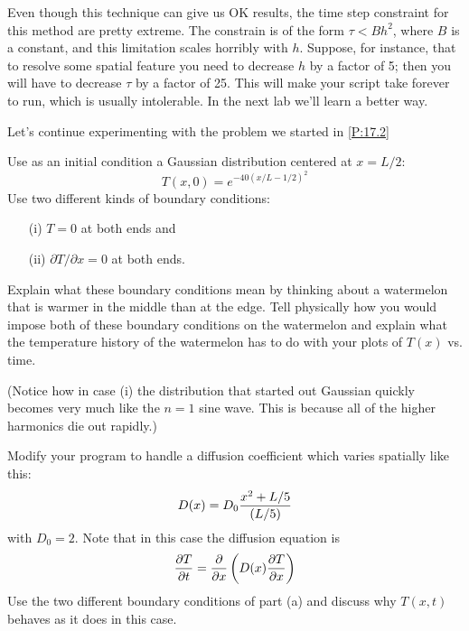Even though this technique can give us OK results, the time
step constraint for this method are pretty extreme.  The
constrain is of the form $\tau < B h^2$, where $B$ is a
constant, and this limitation scales horribly with $h$.
Suppose, for instance, that to resolve some spatial feature you
need to decrease $h$ by a factor of 5; then you will have to
decrease $\tau$ by a factor of 25. This will make your script
take forever to run, which is usually intolerable.  In the next
lab we'll learn a better way.


\begin{enumerate}
\prob  \label{P:17.3} Let's continue experimenting with the problem we started in
\ref{P:17.2}
\begin{enumerate}
\subprob \label{P:17.3a} Use as an initial condition a
    Gaussian distribution centered at $x=L/2$:
    \begin{equation}
        T(x,0) = e^{-40(x/L-1/2)^2}
    \end{equation}
    Use two different kinds of boundary conditions:
    \begin{enumerate}
    \item[(i)] $T=0$ at both ends and
    \item[(ii)] $\partial T /
    \partial x=0$ at both ends.
    \end{enumerate}

    Explain what these boundary conditions mean by thinking
    about a watermelon that is warmer in the middle than at
    the edge. Tell physically how you would impose both of
    these boundary conditions on the watermelon and explain
    what the temperature history of the watermelon has to do
    with your plots of $T(x)$ vs. time.

    (Notice how in case (i) the distribution that started out
    Gaussian quickly becomes very much like the $n=1$ sine
    wave. This is because all of the higher harmonics die out
    rapidly.)


\subprob \label{P:17.3b}  Modify your program to
    handle a diffusion coefficient which varies spatially
    like this:
    \begin{equation}
        D(x) = D_0 {x^2+L/5 \over (L/5)}
    \end{equation}
    with $D_0=2$. Note that in this case the diffusion equation is
    \begin{equation}
        {\partial T \over \partial t} = {\partial  \over \partial x}
        \left( D(x) {\partial T \over \partial x} \right)
    \end{equation}
    Use the two different boundary conditions of part (a) and
    discuss why $T(x,t)$ behaves as it does in this case.

\end{enumerate}
\end{enumerate}
